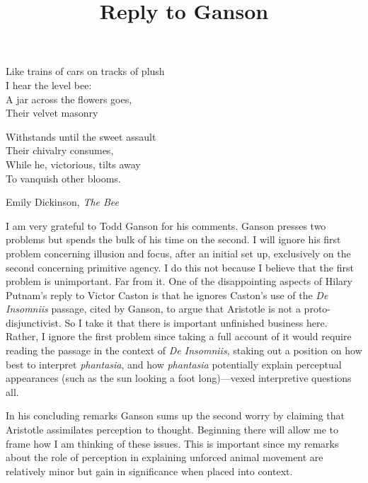 \documentclass[12pt]{article}
\title{Reply to Ganson}
\author{\myauthor}
\date{} %
\begin{document}
\maketitle
\epigraph{Like trains of cars on tracks of plush \\
I hear the level bee: \\
A jar across the flowers goes, \\
Their velvet masonry \\

\hfill \break

Withstands until the sweet assault \\
Their chivalry consumes, \\
While he, victorious, tilts away \\
To vanquish other blooms.}{Emily Dickinson, \emph{The Bee}} %

\setlength{\parindent}{1em}


I am very grateful to Todd Ganson for his comments. Ganson presses two problems but spends the bulk of his time on the second. I will ignore his first problem concerning illusion and focus, after an initial set up, exclusively on the second concerning primitive agency. I do this not because I believe that the first problem is unimportant. Far from it. One of the disappointing aspects of Hilary Putnam's \citeyearpar{Putnam:2012eu} reply to Victor Caston \citeyearpar{Caston:1998nx} is that he ignores Caston's use of the \emph{De Insomniis} passage, cited by Ganson, to argue that Aristotle is not a proto-disjunctivist. So I take it that there is important unfinished business here. Rather, I ignore the first problem since taking a full account of it would require reading the passage in the context of \emph{De Insomniis}, staking out a position on how best to interpret \emph{phantasia}, and how \emph{phantasia} potentially explain perceptual appearances (such as the sun looking a foot long)---vexed interpretive questions all. 

In his concluding remarks Ganson sums up the second worry by claiming that Aristotle assimilates perception to thought. Beginning there will allow me to frame how I am thinking of these issues. This is important since my remarks about the role of perception in explaining unforced animal movement are relatively minor but gain in significance when placed into context.
\end{document}
